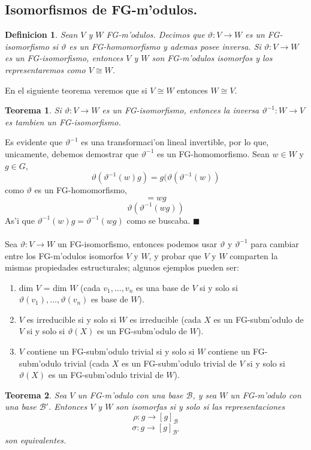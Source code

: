 \documentclass[a4paper,openright,12pt]{report}
\numberwithin{equation}{section} %
\newtheorem{teorema}{Teorema}[section] %
\newtheorem{definicion}{Definicion}[section] %
\newenvironment{proof}{\noindent{\it Demostracion:}}{\hfill$\blacksquare$} %
\begin{document}
\subsection{Isomorfismos de FG-m'odulos.}
\begin{definicion}
Sean $V$ y $W$ FG-m'odulos. Decimos que $\vartheta : V \rightarrow W$ es un FG-isomorfismo si $\vartheta$ es un FG-homomorfismo y ademas posee inversa. Si $\vartheta : V \rightarrow W$ es un FG-isomorfismo, entonces $V$ y $W$ son FG-m'odulos isomorfos y los representaremos como $V \cong W$.
\end{definicion}
En el siguiente teorema veremos que si $V \cong W$ entonces $W \cong V$.
\begin{teorema}
Si $\vartheta : V \rightarrow W$ es un FG-isomorfismo, entonces la inversa $\vartheta^{-1} : W \rightarrow V$ es tambien un FG-isomorfismo.
\end{teorema}
\begin{proof}
Es evidente que $\vartheta^{-1}$ es una transformaci'on lineal invertible, por lo que, unicamente, debemos demostrar que $\vartheta^{-1}$ es un FG-homomorfismo. Sean $w \in W$ y $g \in G$,
\[
\vartheta(\vartheta^{-1}(w)g)=g(\vartheta(\vartheta^{-1}(w))
\]
como $\vartheta$ es un FG-homomorfismo,
\[
=wg
\]
\[
\vartheta(\vartheta^{-1}(wg))
\]
As'i que $\vartheta^{-1}(w)g=\vartheta^{-1}(wg)$ como se buscaba.
\end{proof}\\
\\
Sea $\vartheta : V \rightarrow W$ un FG-isomorfismo, entonces podemos usar $\vartheta$ y $\vartheta^{-1}$ para cambiar entre los FG-m'odulos isomorfos $V$ y $W$, y probar que $V$ y $W$ comparten la mismas propiedades estructurales; algunos ejemplos pueden ser:
\begin{enumerate}
\item dim $V$ = dim $W$ (cada $v_{1}, \ldots ,v_{n} $ es una base de $V$ si y solo si $\vartheta (v_{1}), \ldots ,\vartheta (v_{n})$ es base de $W$).
\item $V$ es irreducible si y solo si $W$ es irreducible (cada $X$  es un FG-subm'odulo de $V$ si y solo si $\vartheta (X)$ es un FG-subm'odulo de $W$).
\item $V$ contiene un FG-subm'odulo trivial si y solo si $W$ contiene un FG-subm'odulo trivial (cada $X$ es un FG-subm'odulo trivial de $V$ si y solo si $\vartheta (X)$ es un FG-subm'odulo trivial de $W$).
\end{enumerate}
\begin{teorema}
Sea $V$ un FG-m'odulo con una base $\mathscr{B}$, y sea $W$ un FG-m'odulo con una base $\mathscr{B'}$. Entonces $V$ y $W$ son isomorfas si y solo si las representaciones
\[
\rho : g \rightarrow [g]_{\mathscr{B}}
\]
\[
\sigma : g \rightarrow [g]_{\mathscr{B'}}
\]
son equivalentes.
\end{teorema}
\end{document}
